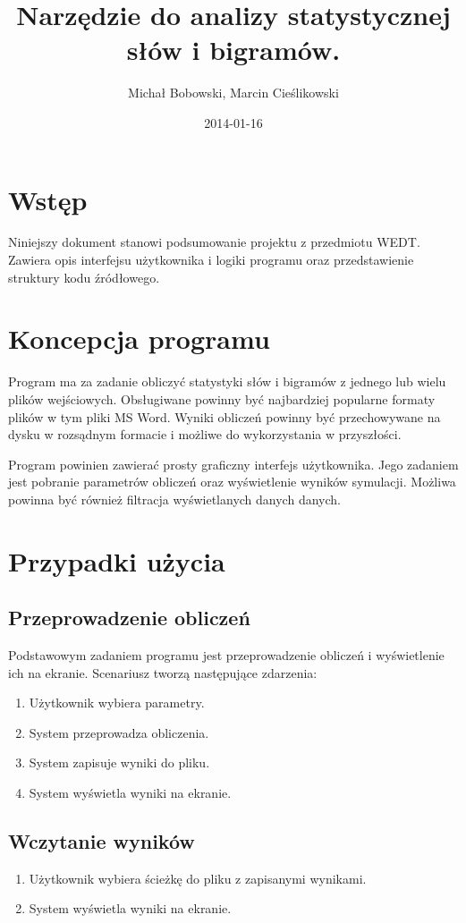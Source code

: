 \documentclass[11pt]{article}
\author{Michał Bobowski, Marcin Cieślikowski}
\date{2014-01-16}
\title{Narzędzie do analizy statystycznej słów i bigramów.}
\begin{document}
  \maketitle

\section{Wstęp}
Niniejszy dokument stanowi podsumowanie projektu z przedmiotu WEDT.
Zawiera opis interfejsu użytkownika i logiki programu oraz przedstawienie struktury kodu źródłowego.

\section{Koncepcja programu}
Program ma za zadanie obliczyć statystyki słów i bigramów z jednego lub wielu plików wejściowych.
Obsługiwane powinny być najbardziej popularne formaty plików w tym pliki MS Word.
Wyniki obliczeń powinny być przechowywane na dysku w rozsądnym formacie i możliwe do wykorzystania w przyszłości.

Program powinien zawierać prosty graficzny interfejs użytkownika.
Jego zadaniem jest pobranie parametrów obliczeń oraz wyświetlenie wyników symulacji.
Możliwa powinna być również filtracja wyświetlanych danych danych.

\section{Przypadki użycia}
\subsection{Przeprowadzenie obliczeń}
Podstawowym zadaniem programu jest przeprowadzenie obliczeń i wyświetlenie ich na ekranie.
Scenariusz tworzą następujące zdarzenia:
\begin{enumerate}
 \item Użytkownik wybiera parametry.
 \item System przeprowadza obliczenia.
 \item System zapisuje wyniki do pliku.
 \item System wyświetla wyniki na ekranie.
\end{enumerate}

\subsection{Wczytanie wyników}
\begin{enumerate}
 \item Użytkownik wybiera ścieżkę do pliku z zapisanymi wynikami.
 \item System wyświetla wyniki na ekranie.
\end{enumerate}
\end{document}
